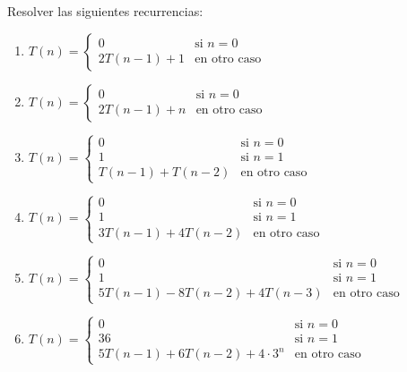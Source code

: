 \begin{ejercicio}
    Resolver las siguientes recurrencias:
    \begin{enumerate}[label=\alph*)]
        \item $T(n) = \begin{cases}
            0 & \text{si } n = 0 \\
            2T(n-1) + 1 & \text{en otro caso}
        \end{cases}$

        \item $T(n) = \begin{cases}
            0 & \text{si } n = 0 \\
            2T(n-1) + n & \text{en otro caso}
        \end{cases}$

        \item $T(n) = \begin{cases}
            0 & \text{si } n = 0 \\
            1 & \text{si } n = 1 \\
            T(n-1) + T(n-2) & \text{en otro caso}
        \end{cases}$

        \item $T(n) = \begin{cases}
            0 & \text{si } n = 0 \\
            1 & \text{si } n = 1 \\
            3T(n-1) + 4T(n-2) & \text{en otro caso}
        \end{cases}$

        \item $T(n) = \begin{cases}
            0 & \text{si } n = 0 \\
            1 & \text{si } n = 1 \\
            5T(n-1) - 8T(n-2) +4T(n-3)& \text{en otro caso}
        \end{cases}$

        \item $T(n) = \begin{cases}
            0 & \text{si } n = 0 \\
            36 & \text{si } n = 1 \\
            5T(n-1) + 6T(n-2) + 4\cdot 3^n & \text{en otro caso}
        \end{cases}$


\end{enumerate}
\end{ejercicio}
